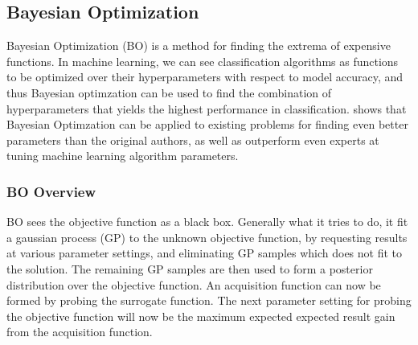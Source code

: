 \subsection{Bayesian Optimization}\label{sec:bayesianoptimization}
Bayesian Optimization (BO) is a method for finding the extrema of expensive functions. In machine learning, we can see classification algorithms as functions to be optimized over their hyperparameters with respect to model accuracy, and thus Bayesian optimzation can be used to find the combination of hyperparameters that yields the highest performance in classification. \citet{snoek2012practical} shows that Bayesian Optimzation can be applied to existing problems for finding even better parameters than the original authors, as well as outperform even experts at tuning machine learning algorithm parameters.  


\subsubsection{BO Overview}
BO sees the objective function as a black box. Generally what it tries to do, it fit a gaussian process (GP) to the unknown objective function, by requesting results at various parameter settings, and eliminating GP samples which does not fit to the solution. The remaining GP samples are then used to form a posterior distribution over the objective function. An acquisition function can now be formed by probing the surrogate function. The next parameter setting for probing the objective function will now be the maximum expected expected result gain from the acquisition function.






